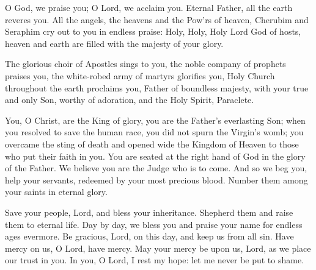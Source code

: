 
O God, we praise you; O Lord, we acclaim you.
Eternal Father, all the earth reveres you.
All the angels, the heavens and the Pow’rs of heaven,
Cherubim and Seraphim cry out to you in endless praise:
Holy, Holy, Holy Lord God of hosts,
heaven and earth are filled with the majesty of your glory.

The glorious choir of Apostles sings to you,
the noble company of prophets praises you,
the white-robed army of martyrs glorifies you,
Holy Church throughout the earth proclaims you,
Father of boundless majesty,
with your true and only Son,
worthy of adoration, and the Holy Spirit, Paraclete.

You, O Christ, are the King of glory,
you are the Father’s everlasting Son;
when you resolved to save the human race, 
you did not spurn the Virgin’s womb;
you overcame the sting of death
and opened wide the Kingdom of Heaven
to those who put their faith in you.
You are seated at the right hand of God
in the glory of the Father.
We believe you are the Judge who is to come. 
And so we beg you, help your servants,
redeemed by your most precious blood.
Number them among your saints in eternal glory.

Save your people, Lord, and bless your inheritance.
Shepherd them and raise them to eternal life.
Day by day, we bless you
and praise your name for endless ages evermore.
Be gracious, Lord, on this day,
and keep us from all sin.
Have mercy on us, O Lord, have mercy.
May your mercy be upon us, Lord,
as we place our trust in you.
In you, O Lord, I rest my hope:
let me never be put to shame.
